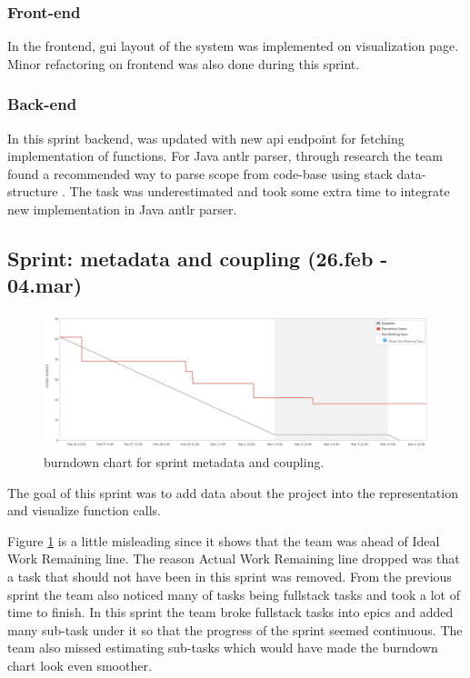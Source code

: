 \subsubsection{Front-end}
In the \gls{frontend}, \gls{gui} layout of the system was implemented on visualization page. Minor refactoring on \gls{frontend} was also done during this \gls{sprint}.

\subsubsection{Back-end}
In this sprint \gls{backend}, was updated with new \gls{api} endpoint for fetching implementation of functions. For Java \gls{antlr} parser, through research the team found a recommended way to parse scope from code-base using stack data-structure \cite{parr2013definitive}. The task was underestimated and took some extra time to integrate new implementation in Java \gls{antlr} parser.

\subsection{Sprint: metadata and coupling (26.feb - 04.mar)}
\begin{figure}[H] 
    \includegraphics[width=\textwidth]{inc/images/sprints/sprintMetaData260219-040319.png}
    \caption{\Gls{burndown} chart for \gls{sprint} metadata and coupling.}
    \label{fig:sprintMetaDataAndCoupling}
\end{figure}
The goal of this \gls{sprint} was to add data about the project into the representation and visualize function calls.

Figure \ref{fig:sprintMetaDataAndCoupling} is a little misleading since it shows that the team was ahead of Ideal Work Remaining line. The reason Actual Work Remaining line dropped was that a task that should not have been in this \gls{sprint} was removed. From the previous \gls{sprint} the team also noticed many of tasks being \gls{fullstack} tasks and took a lot of time to finish. In this \gls{sprint} the team broke \gls{fullstack} tasks into \glspl{epic} and added many sub-task under it so that the progress of the \gls{sprint} seemed continuous. The team also missed estimating sub-tasks which would have made the \gls{burndown} chart look even smoother. 


